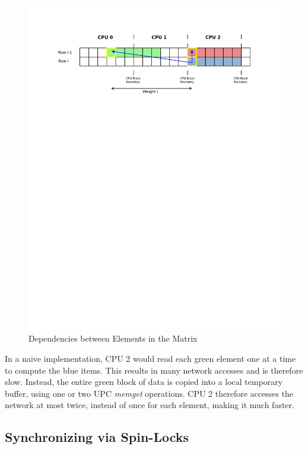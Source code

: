 \documentclass[11pt]{article} %
\begin{document}
\begin{figure}
\begin{centering}
\includegraphics*[width=0.5\paperwidth, viewport= 70 575 540 720]{figures/memcpy_diagram.pdf}
\caption{Dependencies between Elements in the Matrix}
\label{memcpy_diagram}
\end{centering}
\end{figure}

In a naive implementation, CPU 2 would read each green element one at a time to compute the blue items. This results in many network accesses and is therefore slow. Instead, the entire green block of data is copied into a local temporary buffer, using one or two UPC \emph{memget} operations. CPU 2 therefore accesses the network at most twice, instead of once for each element, making it much faster.

\subsection{Synchronizing via Spin-Locks}
\end{document}
